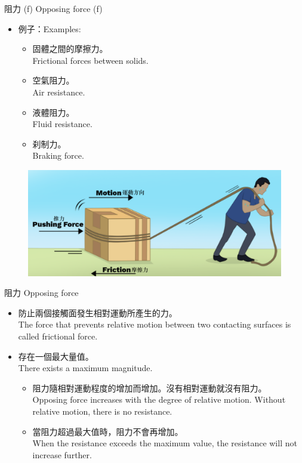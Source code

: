 \documentclass[beamer=true]{standalone}
\begin{document}
\begin{frame}{阻力 (f) Opposing force (f)}
    \begin{itemize}
        \item 例子：Examples:
              \begin{itemize}
                  \item 固體之間的摩擦力。\\Frictional forces between solids.
                  \item 空氣阻力。\\Air resistance.
                  \item 液體阻力。\\Fluid resistance.
                  \item 刹制力。\\Braking force.
              \end{itemize}
    \end{itemize}
    \begin{figure}[h!]
        \centering
        \includegraphics[width=.5\textwidth]{assets/48a9a34c.png}
    \end{figure}
\end{frame}
\begin{frame}{阻力 Opposing force}
    \begin{itemize}
        \item 防止兩個接觸面發生相對運動所產生的力。\\The force that prevents relative motion between two contacting surfaces is called frictional force.
        \item 存在一個最大量值。\\There exists a maximum magnitude.
              \begin{itemize}
                  \item 阻力隨相對運動程度的增加而增加。沒有相對運動就沒有阻力。\\Opposing force increases with the degree of relative motion. Without relative motion, there is no resistance.
                  \item 當阻力超過最大值時，阻力不會再增加。\\When the resistance exceeds the maximum value, the resistance will not increase further.
              \end{itemize}
    \end{itemize}
\end{frame}
\end{document}
